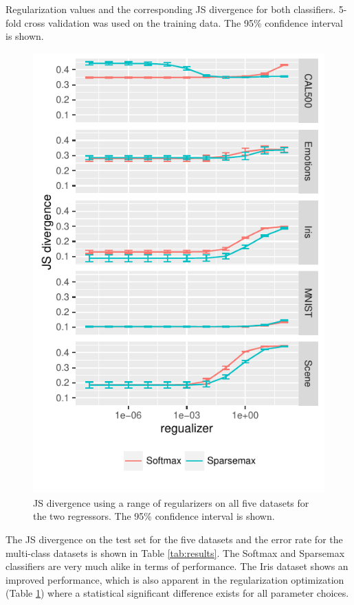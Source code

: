 \begin{table}[H]
\centering

\caption{Regularization values and the corresponding JS divergence for both classifiers. 5-fold cross validation was used on the training data. The 95\% confidence interval is shown.}
\label{tab:hyperparameters}
\end{table}
\begin{figure}[H]
	\centering
	\includegraphics[scale=1]{figures/hyperparameter.pdf}
\caption{JS divergence using a range of regularizers on all five datasets for the two regressors. The 95\% confidence interval is shown.}
\label{fig:hyperparameters}
\end{figure}

The JS divergence on the test set for the five datasets and the error rate for the multi-class datasets is shown in Table \ref{tab:results}. The Softmax and Sparsemax classifiers are very much alike in terms of performance. The Iris dataset shows an improved performance, which is also apparent in the regularization optimization (Table \ref{fig:hyperparameters}) where a statistical significant difference exists for all parameter choices.

